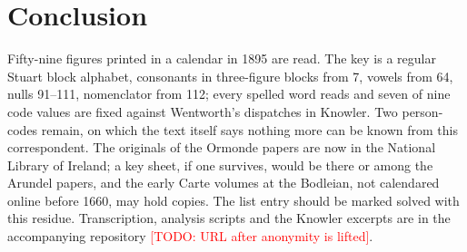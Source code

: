 \documentclass[11pt]{article}
\newcommand{\todo}[1]{\textcolor{red}{[TODO: #1]}}
\begin{document}
\section{Conclusion}

Fifty-nine figures printed in a calendar in 1895 are read. The key is a regular Stuart block alphabet, consonants in three-figure blocks from 7, vowels from 64, nulls 91--111, nomenclator from 112; every spelled word reads and seven of nine code values are fixed against Wentworth's dispatches in Knowler. Two person-codes remain, on which the text itself says nothing more can be known from this correspondent. The originals of the Ormonde papers are now in the National Library of Ireland; a key sheet, if one survives, would be there or among the Arundel papers, and the early Carte volumes at the Bodleian, not calendared online before 1660, may hold copies. The list entry should be marked solved with this residue. Transcription, analysis scripts and the Knowler excerpts are in the accompanying repository \todo{URL after anonymity is lifted}.



\end{document}

